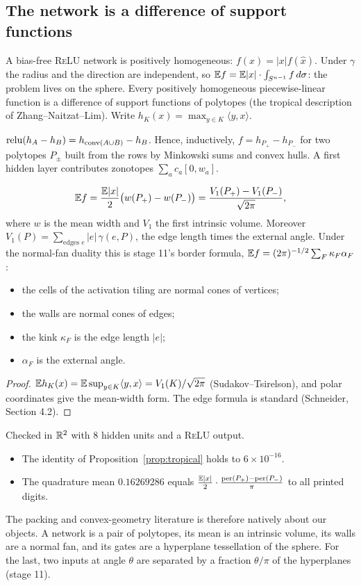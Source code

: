 \label{sec:support}
\subsection{The network is a difference of support functions}
A bias-free \textsc{ReLU} network is positively homogeneous: $f(x)=|x|f(\hat x)$. Under $\gamma$ the radius and the direction are
independent, so $\mathbb E f=\mathbb E|x|\cdot\int_{S^{n-1}}f\,d\sigma$: the problem lives on the sphere. Every positively homogeneous piecewise-linear
function is a difference of support functions of polytopes (the tropical description of Zhang--Naitzat--Lim). Write
$h_K(x)=\max_{y\in K}\langle y,x\rangle$.
\begin{proposition}\label{prop:tropical}
$\operatorname{relu}(h_A-h_B)=h_{\mathrm{conv}(A\cup B)}-h_B$. Hence, inductively, $f=h_{P_+}-h_{P_-}$ for two polytopes $P_\pm$ built from the rows by
Minkowski sums and convex hulls. A first hidden layer contributes zonotopes $\sum_ac_a[0,w_a]$.
\end{proposition}
\begin{theorem}\label{thm:V1}
\[
\mathbb E f=\frac{\mathbb E|x|}2\big(w(P_+)-w(P_-)\big)=\frac{V_1(P_+)-V_1(P_-)}{\sqrt{2\pi}},
\]
where $w$ is the mean width and $V_1$ the first intrinsic volume. Moreover $V_1(P)=\sum_{\text{edges }e}|e|\,\gamma(e,P)$, the edge
length times the external angle. Under the normal-fan duality this is stage 11's border formula,
$\mathbb E f=(2\pi)^{-1/2}\sum_F\kappa_F\alpha_F$:
\begin{itemize}[leftmargin=*]
\item the cells of the activation tiling are normal cones of vertices;
\item the walls are normal cones of edges;
\item the kink $\kappa_F$ is the edge length $|e|$;
\item $\alpha_F$ is the external angle.
\end{itemize}
\end{theorem}
\begin{proof}
$\mathbb E h_K(x)=\mathbb E\sup_{y\in K}\langle y,x\rangle=V_1(K)/\sqrt{2\pi}$ (Sudakov--Tsirelson), and polar coordinates give the mean-width form.
The edge formula is standard (Schneider, Section 4.2).
\end{proof}
Checked in $\mathbb R^2$ with $8$ hidden units and a \textsc{ReLU} output.
\begin{itemize}[leftmargin=*]
\item The identity of Proposition~\ref{prop:tropical} holds to $6\times10^{-16}$.
\item The quadrature mean $0.16269286$ equals $\frac{\mathbb E|x|}2\cdot\frac{\mathrm{per}(P_+)-\mathrm{per}(P_-)}\pi$ to all printed digits.
\end{itemize}
The packing and convex-geometry literature is therefore natively about our objects. A network is a pair of polytopes, its mean is an
intrinsic volume, its walls are a normal fan, and its gates are a hyperplane tessellation of the sphere. For the last, two inputs at
angle $\theta$ are separated by a fraction $\theta/\pi$ of the hyperplanes (stage 11).

